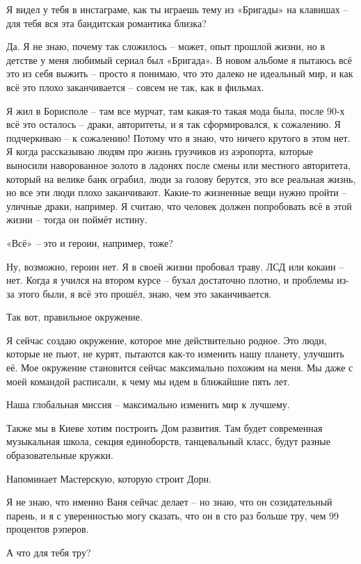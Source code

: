 Я видел у тебя в инстаграме, как ты играешь тему из «Бригады» на клавишах – для
тебя вся эта бандитская романтика близка?

Да. Я не знаю, почему так сложилось – может, опыт прошлой жизни, но в детстве у
меня любимый сериал был «Бригада». В новом альбоме я пытаюсь всё это из себя
выжить – просто я понимаю, что это далеко не идеальный мир, и как всё это плохо
заканчивается – совсем не так, как в фильмах.

Я жил в Борисполе – там все мурчат, там какая-то такая мода была, после 90-х
всё это осталось – драки, авторитеты, и я так сформировался, к сожалению. Я
подчеркиваю – к сожалению! Потому что я знаю, что ничего крутого в этом нет. Я
когда рассказываю людям про жизнь грузчиков из аэропорта, которые выносили
наворованное золото в ладонях после смены или местного авторитета, который на
велике банк ограбил, люди за голову берутся, это все реальная жизнь, но все эти
люди плохо заканчивают. Какие-то жизненные вещи нужно пройти – уличные драки,
например. Я считаю, что человек должен попробовать всё в этой жизни – тогда он
поймёт истину.

«Всё» – это и героин, например, тоже?

Ну, возможно, героин нет. Я в своей жизни пробовал траву. ЛСД или кокаин – нет.
Когда я учился на втором курсе – бухал достаточно плотно, и проблемы из-за
этого были, я всё это прошёл, знаю, чем это заканчивается.

Так вот, правильное окружение.

Я сейчас создаю окружение, которое мне действительно родное. Это люди, которые
не пьют, не курят, пытаются как-то изменить нашу планету, улучшить её. Мое
окружение становится сейчас максимально похожим на меня. Мы даже с моей
командой расписали, к чему мы идем в ближайшие пять лет.

Наша глобальная миссия – максимально изменить мир к лучшему.

Также мы в Киеве хотим построить Дом развития. Там будет современная
музыкальная школа, секция единоборств, танцевальный класс, будут разные
образовательные кружки.

Напоминает Мастерскую, которую строит Дорн.

Я не знаю, что именно Ваня сейчас делает – но знаю, что он созидательный
парень, и я с уверенностью могу сказать, что он в сто раз больше тру, чем 99
процентов рэперов.

А что для тебя тру?

